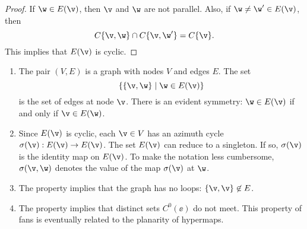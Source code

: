 \begin{proof}  If $\w\in E(\v)$, then $\v$ and $\w$ are not parallel.
Also, if $\w\ne \w'\in E(\v)$, then
\[ 
C\{\v,\w\}\cap C\{\v,\w'\} = C\{\v\}.
\] 
This implies that $E(\v)$ is cyclic.
\end{proof}

\begin{remark}\label{rem:fan}
\begin{enumerate}\wasitemize 
\item The pair $(V,E)$ is a graph with nodes $V$ and edges $E$.  The set
\[ \{\{\v,\w\}\mid \w\in E(\v)\}\]  is
the set of edges at node $\v$.  There is an evident symmetry: $\w\in
E(\v)$ if and only if $\v\in E(\w)$.
%
\item {}%
  Since $E(\v)$ is cyclic, each $\v\in V$ has an azimuth cycle
  $\sigma(\v):E(\v)\to E(\v)$.  The set $E(\v)$ can reduce to a
  singleton. If so, $\sigma(\v)$ is the identity map on $E(\v)$.
%
To make the notation less cumbersome, $\sigma(\v,\w)$ denotes the
value of the map $\sigma(\v)$ at $\w$.
%
\item The property  implies that the graph has no
loops: $\{\v,\v\}\not\in E$.
%
\item The property  implies that distinct sets
$C^0(\ee)$ do not meet.  This property of fans is eventually
related to the  planarity of hypermaps.
%
%
%
%
%
%
\end{enumerate}\wasitemize 
\end{remark}


